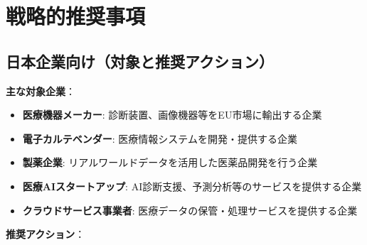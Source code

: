 \documentclass[
  a4paper,
  a4paper,
  11pt]{ltjsbook}
\providecommand{\tightlist}{%
  \setlength{\itemsep}{0pt}\setlength{\parskip}{0pt}}
\begin{document}
\section{戦略的推奨事項}\label{ux6226ux7565ux7684ux63a8ux5968ux4e8bux9805}

\subsection{日本企業向け（対象と推奨アクション）}\label{ux65e5ux672cux4f01ux696dux5411ux3051ux5bfeux8c61ux3068ux63a8ux5968ux30a2ux30afux30b7ux30e7ux30f3}

\textbf{主な対象企業}：

\begin{itemize}
\tightlist
\item
  \textbf{医療機器メーカー}: 診断装置、画像機器等をEU市場に輸出する企業
\item
  \textbf{電子カルテベンダー}: 医療情報システムを開発・提供する企業
\item
  \textbf{製薬企業}: リアルワールドデータを活用した医薬品開発を行う企業
\item
  \textbf{医療AIスタートアップ}:
  AI診断支援、予測分析等のサービスを提供する企業
\item
  \textbf{クラウドサービス事業者}:
  医療データの保管・処理サービスを提供する企業
\end{itemize}

\textbf{推奨アクション}：
\end{document}
